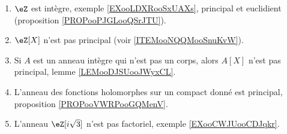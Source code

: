 
\begin{enumerate}
    \item
        \( \eZ\) est intègre, exemple \ref{EXooLDXRooSxUAXs}, principal et euclidient (proposition \ref{PROPooPJGLooQSrJTU}).
    \item
        \( \eZ[X]\) n'est pas principal (voir \ref{ITEMooNQQMooSnuKvW}).
    \item   \label{ITEMooNQQMooSnuKvW}
        Si \( A\) est un anneau intègre qui n'est pas un corps, alors \( A[X]\) n'est pas principal, lemme \ref{LEMooDJSUooJWyxCL}.
    \item
        L'anneau des fonctions holomorphes sur un compact donné est principal, proposition \ref{PROPooVWRPooGQMenV}.
    \item
        L'anneau \( \eZ[i\sqrt{ 3 }]\) n'est pas factoriel, exemple \ref{EXooCWJUooCDJqkr}.
\end{enumerate}
